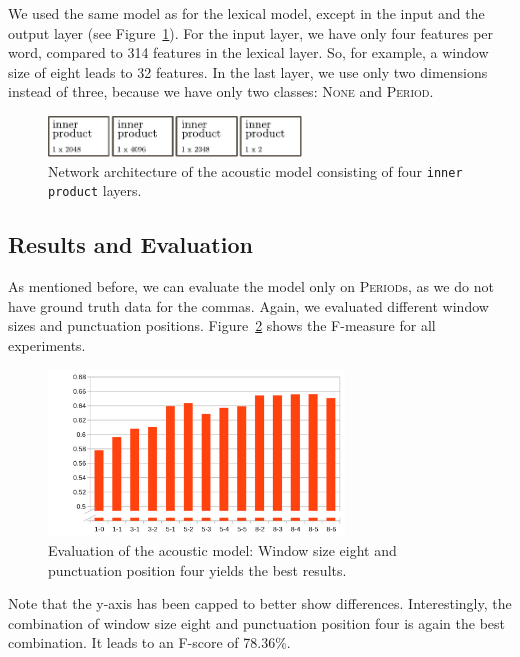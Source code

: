 We used the same model as for the lexical model, except in the input and the output layer (see Figure~\ref{fig:net_acoustic}).
For the input layer, we have only four features per word, compared to 314 features in the lexical layer.
So, for example, a window size of eight leads to 32 features.
In the last layer, we use only two dimensions instead of three, because we have only two classes: \textsc{None} and \textsc{Period}.

\begin{figure}[ht]
    \centering
    \includegraphics[width=0.6\textwidth]{img/net_acoustic.pdf}
    \caption{Network architecture of the acoustic model consisting of four \texttt{inner product} layers.}
    \label{fig:net_acoustic}
\end{figure}

\subsection{Results and Evaluation}

As mentioned before, we can evaluate the model only on \textsc{Period}s, as we do not have ground truth data for the commas.
Again, we evaluated different window sizes and punctuation positions.
Figure~\ref{audio_eval} shows the F-measure for all experiments.
\begin{figure}[ht]
    \centering
    \includegraphics[width=0.7\textwidth]{img/audio_parameter_eval.png}
    \caption{Evaluation of the acoustic model: Window size eight and punctuation position four yields the best results.}
    \label{audio_eval}
\end{figure}
Note that the y-axis has been capped to better show differences.
Interestingly, the combination of window size eight and punctuation position four is again the best combination.
It leads to an F-score of 78.36\%.